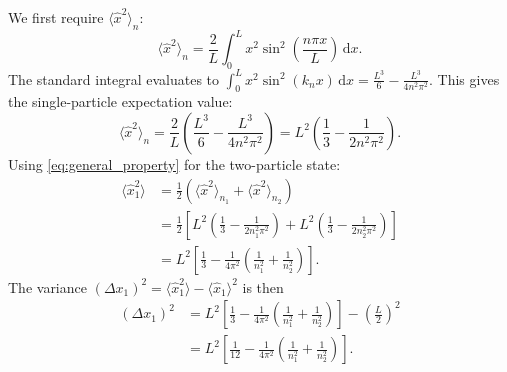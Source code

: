 We first require $\langle \hat{x}^2 \rangle_n$:
\begin{equation}
  \langle \hat{x}^2 \rangle_n = \frac{2}{L}
  \int_0^L x^2 \sin^2\left(\frac{n\pi x}{L}\right) \,\mathrm{d}x.
\end{equation}
The standard integral evaluates to
$\int_0^L x^2 \sin^2(k_n x) \, \mathrm{d}x =
\frac{L^3}{6} - \frac{L^3}{4n^2\pi^2}$.
This gives the single-particle expectation value:
\begin{equation}
  \langle \hat{x}^2 \rangle_n =
  \frac{2}{L} \left( \frac{L^3}{6} - \frac{L^3}{4n^2\pi^2} \right)
  = L^2 \left( \frac{1}{3} - \frac{1}{2n^2\pi^2} \right).
\end{equation}
Using \cref{eq:general_property} for the two-particle state:
\begin{align}
  \langle \hat{x}_1^2 \rangle &= \frac{1}{2}
  \left( \langle \hat{x}^2 \rangle_{n_1} +
  \langle \hat{x}^2 \rangle_{n_2} \right) \nonumber \\
  &= \frac{1}{2} \left[ L^2 \left( \frac{1}{3} -
  \frac{1}{2n_1^2\pi^2} \right) +
  L^2 \left( \frac{1}{3} - \frac{1}{2n_2^2\pi^2} \right) \right] \nonumber \\
  &= L^2 \left[ \frac{1}{3} - \frac{1}{4\pi^2}
  \left( \frac{1}{n_1^2} + \frac{1}{n_2^2} \right) \right].
\end{align}
The variance $(\Delta x_1)^2 = \langle \hat{x}_1^2 \rangle
- \langle \hat{x}_1 \rangle^2$ is then
\begin{align}
  (\Delta x_1)^2 &= L^2 \left[ \frac{1}{3} - \frac{1}{4\pi^2}
  \left( \frac{1}{n_1^2} + \frac{1}{n_2^2} \right) \right]
  - \left( \frac{L}{2} \right)^2 \nonumber \\
  &= L^2 \left[ \frac{1}{12} - \frac{1}{4\pi^2}
  \left( \frac{1}{n_1^2} + \frac{1}{n_2^2} \right) \right].
\end{align}

